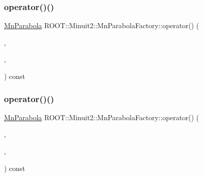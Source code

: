 \subsubsection{\texorpdfstring{operator()()}{operator()()}\hspace{0.1cm}{\footnotesize\ttfamily [2/6]}}
{\footnotesize\ttfamily \mbox{\hyperlink{classROOT_1_1Minuit2_1_1MnParabola}{Mn\+Parabola}} R\+O\+O\+T\+::\+Minuit2\+::\+Mn\+Parabola\+Factory\+::operator() (\begin{DoxyParamCaption}\item[{const \mbox{\hyperlink{classROOT_1_1Minuit2_1_1MnParabolaPoint}{Mn\+Parabola\+Point}} \&}]{,  }\item[{const \mbox{\hyperlink{classROOT_1_1Minuit2_1_1MnParabolaPoint}{Mn\+Parabola\+Point}} \&}]{,  }\item[{const \mbox{\hyperlink{classROOT_1_1Minuit2_1_1MnParabolaPoint}{Mn\+Parabola\+Point}} \&}]{ }\end{DoxyParamCaption}) const}

\mbox{\label{classROOT_1_1Minuit2_1_1MnParabolaFactory_aa5ff96ea03013f1dcbbac298fe26e484}} 
\subsubsection{\texorpdfstring{operator()()}{operator()()}\hspace{0.1cm}{\footnotesize\ttfamily [3/6]}}
{\footnotesize\ttfamily \mbox{\hyperlink{classROOT_1_1Minuit2_1_1MnParabola}{Mn\+Parabola}} R\+O\+O\+T\+::\+Minuit2\+::\+Mn\+Parabola\+Factory\+::operator() (\begin{DoxyParamCaption}\item[{const \mbox{\hyperlink{classROOT_1_1Minuit2_1_1MnParabolaPoint}{Mn\+Parabola\+Point}} \&}]{,  }\item[{const \mbox{\hyperlink{classROOT_1_1Minuit2_1_1MnParabolaPoint}{Mn\+Parabola\+Point}} \&}]{,  }\item[{const \mbox{\hyperlink{classROOT_1_1Minuit2_1_1MnParabolaPoint}{Mn\+Parabola\+Point}} \&}]{ }\end{DoxyParamCaption}) const}

\mbox{\label{classROOT_1_1Minuit2_1_1MnParabolaFactory_ab4b6a74b071f4d780dbf6b4663c188b3}} 
